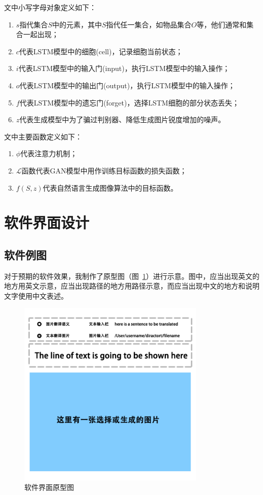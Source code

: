 文中小写字母对象定义如下：
\begin{enumerate}[fullwidth,itemindent=2em,label=\arabic*.]
    \item $s$指代集合$S$中的元素，其中$S$指代任一集合，如物品集合$O$等，他们通常和集合一起出现；
    \item $c$代表LSTM模型中的细胞(cell)，记录细胞当前状态；
    \item $i$代表LSTM模型中的输入门(input)，执行LSTM模型中的输入操作；
    \item $o$代表LSTM模型中的输出门(output)，执行LSTM模型中的输入操作；
    \item $f$代表LSTM模型中的遗忘门(forget)，选择LSTM细胞的部分状态丢失；
    \item $z$代表生成模型中为了骗过判别器、降低生成图片锐度增加的噪声。
\end{enumerate}

文中主要函数定义如下：
\begin{enumerate}[fullwidth,itemindent=2em,label=\arabic*.]
    \item $\phi$代表注意力机制；
    \item $\mathcal{L}$函数代表GAN模型中用作训练目标函数的损失函数；
    \item $f(S,z)$代表自然语言生成图像算法中的目标函数。
\end{enumerate}

\section{软件界面设计}
\subsection{软件例图}
对于预期的软件效果，我制作了原型图（图~\ref{fig:UIproto}）进行示意。图中，应当出现英文的地方用英文示意，应当出现路径的地方用路径示意，而应当出现中文的地方和说明文字使用中文表述。
\begin{figure}[!htb]
    \centering
    \includegraphics[width=0.8\textwidth]{figures/界面原型图.png}
    \caption{软件界面原型图}
    \label{fig:UIproto}
  \end{figure}

